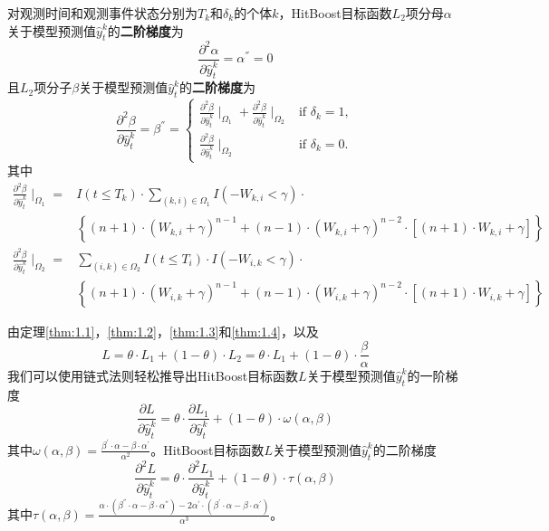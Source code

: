\begin{theorem}\label{thm:1.4}
对观测时间和观测事件状态分别为$T_k$和$\delta_k$的个体$k$，HitBoost目标函数$L_2$项分母$\alpha$关于模型预测值$\hat{y}_t^k$的\textbf{二阶梯度}为$$
\frac{\partial^2 \alpha}{\partial \hat{y}_t^k}=\alpha^{''}=0
$$ 且$L_2$项分子$\beta$关于模型预测值$\hat{y}_t^k$的\textbf{二阶梯度}为$$
\frac{\partial^2 \beta}{\partial \hat{y}_t^k}=\beta^{''}=
\begin{cases}
\frac{\partial^2 \beta}{\partial \hat{y}_t^k} \mid_{\Omega_1} + \frac{\partial^2 \beta}{\partial \hat{y}_t^k} \mid_{\Omega_2} & \text{if } \delta_k = 1,\\
\frac{\partial^2 \beta}{\partial \hat{y}_t^k} \mid_{\Omega_2} & \text{if } \delta_k = 0.
\end{cases}
$$ 其中\[
\begin{split}
\frac{\partial^2 \beta}{\partial \hat{y}_t^k} \mid_{\Omega_1} =& I(t\le T_k)\cdot \sum\limits_{(k,i)\in \Omega_1} I(-W_{k,i}<\gamma)\cdot \\
  & \left\{(n+1)\cdot (W_{k,i}+\gamma)^{n-1} + (n-1)\cdot (W_{k,i}+\gamma)^{n-2}\cdot [(n+1)\cdot W_{k,i}+\gamma]\right\} \\
\frac{\partial^2 \beta}{\partial \hat{y}_t^k} \mid_{\Omega_2} =& \sum\limits_{(i,k)\in \Omega_2} I(t\le T_i)\cdot I(-W_{i,k}<\gamma)\cdot \\
  & \left\{(n+1)\cdot (W_{i,k}+\gamma)^{n-1} + (n-1)\cdot (W_{i,k}+\gamma)^{n-2}\cdot [(n+1)\cdot W_{i,k}+\gamma]\right\}
\end{split}
\]
\end{theorem}

由定理\ref{thm:1.1}，\ref{thm:1.2}，\ref{thm:1.3}和\ref{thm:1.4}，以及
\begin{equation}
L=\theta\cdot L_1 + (1-\theta)\cdot L_2= \theta\cdot L_1 + (1-\theta)\cdot \frac{\beta}{\alpha}
\end{equation} 
我们可以使用链式法则轻松推导出HitBoost目标函数$L$关于模型预测值$\hat{y}_t^k$的一阶梯度
\begin{equation}
\frac{\partial L}{\partial \hat{y}_t^k}=\theta\cdot \frac{\partial L_1}{\partial \hat{y}_t^k} + (1-\theta)\cdot \omega(\alpha, \beta)
\end{equation}
其中$\omega(\alpha, \beta)=\frac{\beta^{'}\cdot \alpha - \beta\cdot \alpha^{'}}{\alpha^2}$。HitBoost目标函数$L$关于模型预测值$\hat{y}_t^k$的二阶梯度
\begin{equation}
\frac{\partial^2 L}{\partial \hat{y}_t^k}=\theta\cdot \frac{\partial^2 L_1}{\partial \hat{y}_t^k} + (1-\theta)\cdot \tau(\alpha, \beta)
\end{equation} 
其中$\tau(\alpha, \beta)=\frac{\alpha\cdot (\beta^{''}\cdot \alpha - \beta\cdot \alpha^{''})-2\alpha^{'}\cdot (\beta^{'}\cdot \alpha - \beta\cdot \alpha^{'})}{\alpha^3}$。

